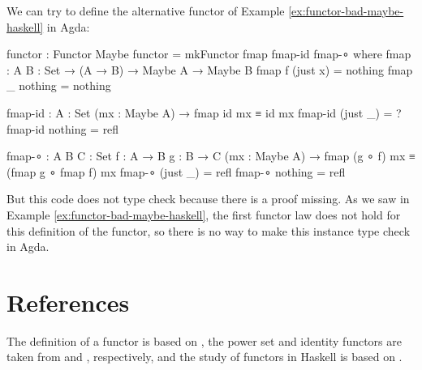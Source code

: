 \begin{example}
  \label{ex:functor-bad-maybe-agda}

  We can try to define the alternative  functor of
  Example \ref{ex:functor-bad-maybe-haskell} in Agda:
  \begin{codeagda}
functor : Functor Maybe
functor = mkFunctor fmap fmap-id fmap-∘
  where
    fmap : {A B : Set} → (A → B) → Maybe A → Maybe B
    fmap f (just x) = nothing
    fmap _ nothing  = nothing

    fmap-id : {A : Set} (mx : Maybe A) → fmap id mx ≡ id mx
    fmap-id (just _) = ?
    fmap-id nothing  = refl

    fmap-∘ : {A B C : Set} {f : A → B} {g : B → C}
             (mx : Maybe A) → fmap (g ∘ f) mx ≡ (fmap g ∘ fmap f) mx
    fmap-∘ (just _) = refl
    fmap-∘ nothing  = refl
  \end{codeagda}
  But this code does not type check because there is a proof missing.
  As we saw in Example \ref{ex:functor-bad-maybe-haskell}, the first
  functor law does not hold for this definition of the
   functor, so there is no way to make this instance
  type check in Agda.

\end{example}

\section{References}
\label{sec:functors-references}

The definition of a functor is based on
\parencites[13]{maclane-1998}[428]{poigne-1992}, the power set and
identity functors are taken from \parencites[431]{poigne-1992} and
\parencite[11]{marquis-2013}, respectively, and the study of functors
in Haskell is based on \parencites[146--150,
  218--227]{lipovaca-2011}[18--23]{yorgey-2009}.

\clearemptydoublepage
